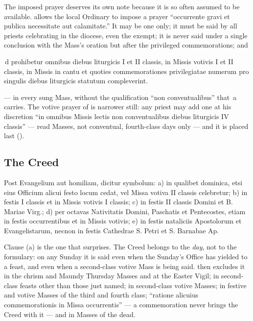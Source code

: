 The imposed prayer deserves its own note because it is so often assumed to be
available.  allows the local Ordinary to impose a prayer ``occurrente
gravi et publica necessitate aut calamitate.'' It may be one only; it must be
said by all priests celebrating in the diocese, even the exempt; it is never
said under a single conclusion with the Mass's oration but after the privileged
commemorations; and

\begin{rulebox}{\,d}
prohibetur omnibus diebus liturgicis I et II classis, in Missis votivis I et II
classis, in Missis in cantu et quoties commemorationes privilegiatae numerum
pro singulis diebus liturgicis statutum compleverint.
\end{rulebox}

\noindent
{} --- in every sung Mass, without the qualification
``non conventualibus'' that \,a carries. The votive prayer of
 is narrower still: any priest may add one at his discretion ``in
omnibus Missis lectis non conventualibus diebus liturgicis IV classis'' --- read
Masses, not conventual, fourth-class days only --- and it is placed last
().

\subsection{The Creed}

\begin{rulebox}{}
Post Evangelium aut homiliam, dicitur symbolum: a) in qualibet dominica, etsi
eius Officium alicui festo locum cedat, vel Missa votiva II classis
celebretur; b) in festis I classis et in Missis votivis I classis; c) in
festis II classis Domini et B. Mariae Virg.; d) per octavas Nativitatis
Domini, Paschatis et Pentecostes, etiam in festis occurrentibus et in Missis
votivis; e) in festis nataliciis Apostolorum et Evangelistarum, necnon in
festis Cathedrae S. Petri et S. Barnabae Ap.
\end{rulebox}

Clause (a) is the one that surprises. The Creed belongs to the \emph{day},
not to the formulary: on any Sunday it is said even when the Sunday's Office
has yielded to a feast, and even when a second-class votive Mass is being said.
 then excludes it in the chrism and Maundy Thursday Masses and at the
Easter Vigil; in second-class feasts other than those just named; in
second-class votive Masses; in festive and votive Masses of the third and
fourth class; ``ratione alicuius commemorationis in Missa occurrentis'' --- a
commemoration never brings the Creed with it --- and in Masses of the dead.

